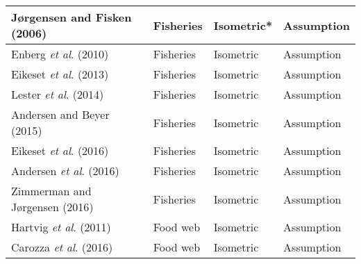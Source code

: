 \documentclass[a4paper]{article} %
\begin{document}
\begin{table}[H]
\begin{tabular}{|l|l|l|l|}
    Jørgensen and Fisken (2006)         & Fisheries                 & Isometric*       & Assumption                     \\ \hline
    Enberg \textit{et al}. (2010)       & Fisheries                 & Isometric        & Assumption                     \\ \hline
    Eikeset \textit{et al}. (2013)      & Fisheries                 & Isometric        & Assumption                     \\ \hline
    Lester \textit{et al}. (2014)       & Fisheries                 & Isometric        & Assumption                     \\ \hline
    Andersen and Beyer (2015)           & Fisheries                 & Isometric        & Assumption                     \\ \hline
    Eikeset \textit{et al}. (2016)      & Fisheries                 & Isometric        & Assumption                     \\ \hline
    Andersen \textit{et al}. (2016)     & Fisheries                 & Isometric        & Assumption                     \\ \hline
    Zimmerman and Jørgensen (2016)      & Fisheries                 & Isometric        & Assumption                     \\ \hline
    Hartvig \textit{et al}. (2011)      & Food web                  & Isometric        & Assumption                     \\ \hline
    Carozza \textit{et al}. (2016)      & Food web                  & Isometric        & Assumption                     \\ \hline
    \end{tabular}
    \label{caloric_equivalents}
\end{table}

\newpage{}

\let\mkbibnamefamily\textsc\printbibliography[title=SI Bibliography]\thispagestyle{empty} %
\end{document}
